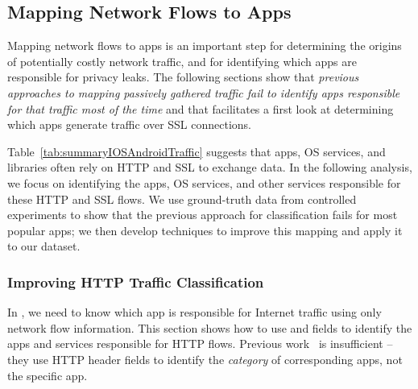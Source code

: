 \subsection{Mapping Network Flows to Apps}
\label{sec:classification-methodology}

Mapping network flows to apps is an important step for determining the origins of potentially costly 
network traffic, and for identifying which apps are responsible for privacy leaks. The following 
sections show that  \emph{previous approaches to mapping passively gathered traffic fail to identify
apps responsible for that traffic most of the time} and that \meddle facilitates a first look at 
determining which apps generate traffic over SSL connections.





Table~\ref{tab:summaryIOSAndroidTraffic} suggests that apps, OS services, and libraries often rely on HTTP and SSL to exchange data.
In the following analysis, we focus on identifying the apps, OS services, and other services responsible for these HTTP and SSL flows. 
We use ground-truth data from controlled experiments to show that the previous approach for classification fails 
for most popular apps; we then develop techniques to improve this mapping and apply it to our \mobWild dataset. 

\subsubsection{Improving HTTP Traffic Classification}
In \meddle, we need to know which app is responsible for Internet traffic using only network flow information. This section shows how to use \useragent and \httphost fields to identify the apps and services responsible for HTTP flows. Previous work~\cite{maier:mobtraffic,xu:appusage} is insufficient -- they use HTTP header fields to identify the \emph{category} of corresponding apps, not the specific app.


